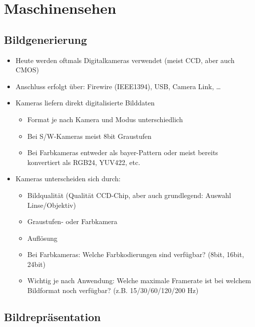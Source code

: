 
\section{Maschinensehen}

\subsection{Bildgenerierung}

\begin{itemize}
\item Heute werden oftmals Digitalkameras verwendet (meist CCD, aber auch CMOS)
\item Anschluss erfolgt über: Firewire (IEEE1394), USB, Camera Link, \dots
\item Kameras liefern direkt digitalisierte Bilddaten
\begin{itemize}
\item Format je nach Kamera und Modus unterschiedlich
\item Bei S/W-Kameras meist 8bit Graustufen
\item Bei Farbkameras entweder als bayer-Pattern oder meist bereits konvertiert als RGB24, YUV422, etc.
\end{itemize}
\item Kameras unterscheiden sich durch:
\begin{itemize}
\item Bildqualität (Qualität CCD-Chip, aber auch grundlegend: Auswahl Linse/Objektiv)
\item Graustufen- oder Farbkamera
\item Auflösung
\item Bei Farbkameras: Welche Farbkodierungen sind verfügbar? (8bit, 16bit, 24bit)
\item Wichtig je nach Anwendung: Welche maximale Framerate ist bei welchem Bildformat noch verfügbar? (z.B. 15/30/60/120/200 Hz)
\end{itemize}
\end{itemize}

\subsection{Bildrepräsentation}

